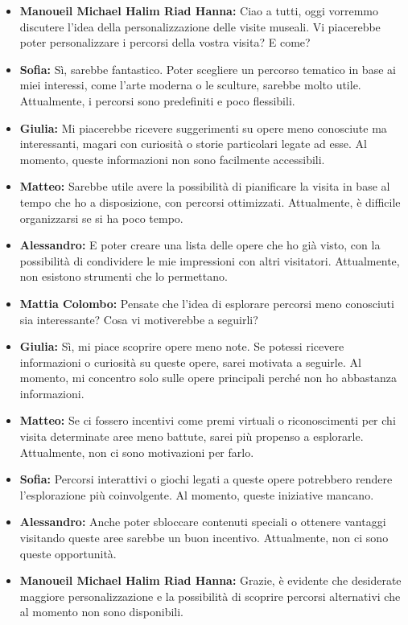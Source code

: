 \documentclass{article}
\begin{document}
\begin{itemize}

\item \textbf{Manoueil Michael Halim Riad Hanna:} Ciao a tutti, oggi vorremmo discutere l’idea della personalizzazione delle visite museali. Vi piacerebbe poter personalizzare i percorsi della vostra visita? E come?

\item \textbf{Sofia:} Sì, sarebbe fantastico. Poter scegliere un percorso tematico in base ai miei interessi, come l’arte moderna o le sculture, sarebbe molto utile. Attualmente, i percorsi sono predefiniti e poco flessibili.

\item \textbf{Giulia:} Mi piacerebbe ricevere suggerimenti su opere meno conosciute ma interessanti, magari con curiosità o storie particolari legate ad esse. Al momento, queste informazioni non sono facilmente accessibili.

\item \textbf{Matteo:} Sarebbe utile avere la possibilità di pianificare la visita in base al tempo che ho a disposizione, con percorsi ottimizzati. Attualmente, è difficile organizzarsi se si ha poco tempo.

\item \textbf{Alessandro:} E poter creare una lista delle opere che ho già visto, con la possibilità di condividere le mie impressioni con altri visitatori. Attualmente, non esistono strumenti che lo permettano.

\item \textbf{Mattia Colombo:} Pensate che l’idea di esplorare percorsi meno conosciuti sia interessante? Cosa vi motiverebbe a seguirli?

\item \textbf{Giulia:} Sì, mi piace scoprire opere meno note. Se potessi ricevere informazioni o curiosità su queste opere, sarei motivata a seguirle. Al momento, mi concentro solo sulle opere principali perché non ho abbastanza informazioni.

\item \textbf{Matteo:} Se ci fossero incentivi come premi virtuali o riconoscimenti per chi visita determinate aree meno battute, sarei più propenso a esplorarle. Attualmente, non ci sono motivazioni per farlo.

\item \textbf{Sofia:} Percorsi interattivi o giochi legati a queste opere potrebbero rendere l’esplorazione più coinvolgente. Al momento, queste iniziative mancano.

\item \textbf{Alessandro:} Anche poter sbloccare contenuti speciali o ottenere vantaggi visitando queste aree sarebbe un buon incentivo. Attualmente, non ci sono queste opportunità.

\item \textbf{Manoueil Michael Halim Riad Hanna:} Grazie, è evidente che desiderate maggiore personalizzazione e la possibilità di scoprire percorsi alternativi che al momento non sono disponibili.

\end{itemize}
\end{document}
